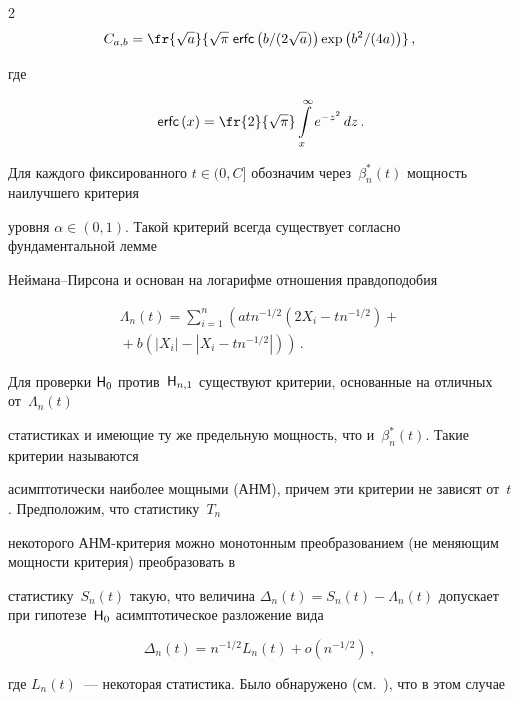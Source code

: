 \begin{multicols}{2}
$$


\cab = \fr{\sqrt{a}}{\sqrt{\pi}\;{\sf erfc}\left (b/(2\sqrt{a})\right )\exp \left(b^2/(4a)\right)}\,,


$$


где


$$


\ercx{x} = \fr{2}{\sqrt{\pi}}\int\limits_x^{\infty} e^{-z^2}\,dz\,.


$$


Для каждого фиксированного $t\in(0,C]$ обозначим через~$\beta_n^*(t)$ мощность наилучшего критерия 


уровня $\alpha \in (0,1)$. Такой критерий всегда существует согласно фундаментальной лемме 


Неймана--Пир\-со\-на и основан на логарифме отношения правдоподобия


\begin{multline*}


\Lambda_n(t) = \sum_{i = 1}^n\left(atn^{-1/2}\left(2X_i - tn^{-1/2}\right) +{}\right.\\


\left.{}+ b\left(|X_i| - |X_i - tn^{-1/2}|\right)\right)\,.




\end{multline*}


Для проверки ${\sf H}_0$ против~${\sf H}_{n,1}$ существуют критерии, основанные на отличных от~$\Lambda_n(t)$ 


статистиках и имеющие ту же предельную мощность, что и~$\beta_n^*(t)$. Такие критерии называются 


асимптотически наиболее мощными (АНМ), причем эти критерии не зависят от~$t$. Предположим, что статистику~$T_n$ 


некоторого АНМ-кри\-те\-рия можно монотонным преобразованием (не меняющим мощности критерия) преобразовать в 


статистику~$S_n(t)$ такую, что величина $\Delta_n(t) = S_n(t) - 


\Lambda_n(t)$ допускает при гипотезе~${\sf H}_0$ асимптотическое разложение вида


\begin{equation}


\Delta_n(t) = n^{-1/2} L_n(t) +  o (n^{-1/2})\,,


\label{l3}


\end{equation}


где $L_n(t)$~--- некоторая статистика. Было обнаружено (см.~\cite{bening}), что в этом случае 



\end{multicols}
